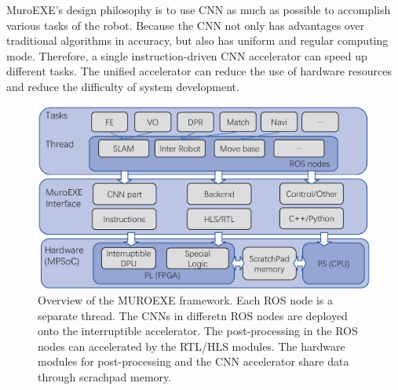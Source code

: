 \label{sec:muroexe}

MuroEXE's design philosophy is to use CNN as much as possible to accomplish various tasks of the robot. Because the CNN not only has advantages over traditional algorithms in accuracy, but also has uniform and regular computing mode. Therefore, a single instruction-driven CNN accelerator can speed up different tasks. The unified accelerator can reduce the use of hardware resources and reduce the difficulty of system development.



\begin{figure}[t]
	\centering
    \includegraphics[width=0.99\linewidth]{fig/muroexe.eps}
    \caption{ Overview of the MUROEXE framework. Each ROS node is a separate thread. The CNNs in differetn ROS nodes are deployed onto the interruptible accelerator. The post-processing in the ROS nodes can accelerated by the RTL/HLS modules. The hardware modules for post-processing and the CNN accelerator share data through scrachpad memory. }
	\label{fig:muroexe}
\end{figure}